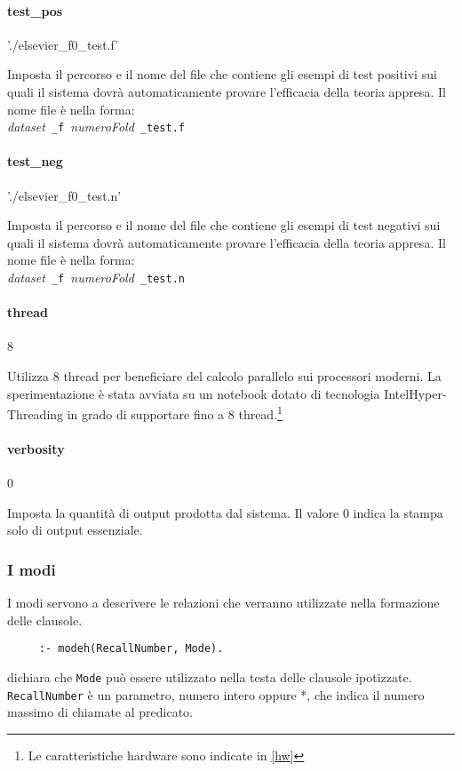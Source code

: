 \paragraph{test\_pos}   './elsevier\_f0\_test.f'

      Imposta il percorso e il nome del file che contiene gli esempi di test positivi sui quali il sistema dovrà automaticamente provare l'efficacia della teoria appresa. Il nome file è nella forma:\\ \emph{dataset}~\verb+_f+~\emph{numeroFold}~\verb+_test.f+

\paragraph{test\_neg}   './elsevier\_f0\_test.n'

      Imposta il percorso e il nome del file che contiene gli esempi di test negativi sui quali il sistema dovrà automaticamente provare l'efficacia della teoria appresa. Il nome file è nella forma:\\ \emph{dataset}~\verb+_f+~\emph{numeroFold}~\verb+_test.n+
      
\paragraph{thread}   8

   Utilizza 8 thread per beneficiare del calcolo parallelo sui processori moderni. La sperimentazione è stata avviata su un notebook dotato di tecnologia Intel\textregistered Hyper-Threading in grado di supportare fino a 8 thread.\footnote{Le caratteristiche hardware sono indicate in \ref{hw}}
 
\paragraph{verbosity}   0

Imposta la quantità di output prodotta dal sistema. Il valore $0$ indica la stampa solo di output essenziale.

\subsubsection*{I modi}
I modi servono a descrivere le relazioni che verranno utilizzate nella formazione delle clausole.

\begin{verbatim}
     :- modeh(RecallNumber, Mode).
\end{verbatim}
dichiara che \verb+Mode+ può essere utilizzato nella testa delle clausole ipotizzate. \verb+RecallNumber+ è un parametro, numero intero oppure *, che indica il numero massimo di chiamate al predicato.

